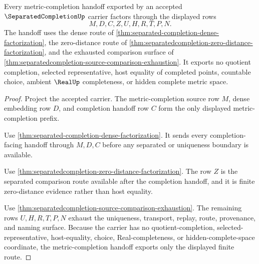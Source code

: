 \begin{theorem}
\label{thm:separatedcompletion-metric-completion-handoff}
Every metric-completion handoff exported by an accepted $\SeparatedCompletionUp$ carrier factors through the displayed rows
$$
M,D,C,Z,U,H,R,T,P,N .
$$
The handoff uses the dense route of \autoref{thm:separated-completion-dense-factorization}, the zero-distance route of \autoref{thm:separatedcompletion-zero-distance-factorization}, and the exhausted comparison surface of \autoref{thm:separatedcompletion-source-comparison-exhaustion}. It exports no quotient completion, selected representative, host equality of completed points, countable choice, ambient $\RealUp$ completeness, or hidden complete metric space.
\end{theorem}
\begin{proof}
Project the accepted carrier. The metric-completion source row $M$, dense embedding row $D$, and completion handoff row $C$ form the only displayed metric-completion prefix.

Use \autoref{thm:separated-completion-dense-factorization}. It sends every completion-facing handoff through $M,D,C$ before any separated or uniqueness boundary is available.

Use \autoref{thm:separatedcompletion-zero-distance-factorization}. The row $Z$ is the separated comparison route available after the completion handoff, and it is finite zero-distance evidence rather than host equality.

Use \autoref{thm:separatedcompletion-source-comparison-exhaustion}. The remaining rows $U,H,R,T,P,N$ exhaust the uniqueness, transport, replay, route, provenance, and naming surface. Because the carrier has no quotient-completion, selected-representative, host-equality, choice, Real-completeness, or hidden-complete-space coordinate, the metric-completion handoff exports only the displayed finite route.
\end{proof}

